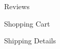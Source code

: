 \documentclass[11pt]{report}
\begin{document}
\begin{figure}[H]
	\caption{Reviews}
	\label{fig:dfd3}
\end{figure}
\begin{figure}[H]
	\caption{Shopping Cart}
	\label{fig:s5}
\end{figure}
\begin{figure}[H]
	\caption{Shipping Details}
	\label{fig:s6}
\end{figure} 
\end{document}
